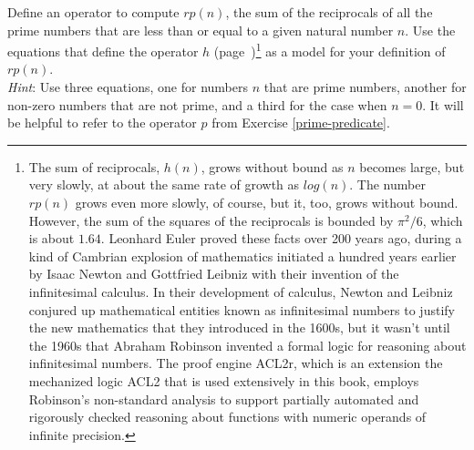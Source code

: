 \begin{ExerciseList}
\Exercise Define an operator to compute $rp(n)$,
the sum of the reciprocals of all the prime numbers that are less than or equal to
a given natural number $n$.
Use the equations that define the operator
$h$ (page~\pageref{reciprocalsdef})\footnote{The
sum of reciprocals, $h(n)$, grows without bound as $n$ becomes large,
but very slowly, at about the same rate of growth as $log(n)$.
The number $rp(n)$ grows even more slowly, of course,
but it, too, grows without bound.
However, the sum of the squares of the reciprocals is bounded
by $\pi^2/6$, which is about $1.64$.
Leonhard Euler proved these facts over 200 years ago, during
a kind of Cambrian explosion of mathematics initiated a hundred years earlier
by Isaac Newton and Gottfried Leibniz with their invention of the infinitesimal calculus.
In their development of calculus,
Newton and Leibniz conjured up mathematical entities known as infinitesimal numbers
to justify the new mathematics that they introduced in the 1600s,
but it wasn't until the 1960s that Abraham Robinson invented a formal logic
for reasoning about infinitesimal numbers.
The proof engine ACL2r, which is an extension the mechanized logic ACL2 that is used
extensively in this book, employs Robinson's non-standard analysis to support partially
automated and rigorously checked reasoning about functions with
numeric operands of infinite precision.}
as a model for your definition of $rp(n)$.\\
\emph{Hint}: Use three equations, one for numbers $n$ that are prime numbers,
another for non-zero numbers that are not prime,
and a third for the case when $n = 0$.
It will be helpful to refer to the operator $p$ from Exercise \ref{prime-predicate}.
\end{ExerciseList}


